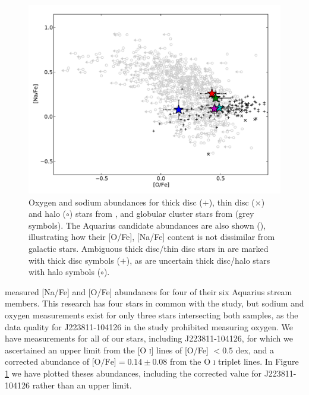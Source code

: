 \documentclass{emulateapj}
\begin{document}
\begin{figure}[t!]
	\includegraphics[width=\textwidth]{./figures/aquarius-o-na-halo.pdf}
	\caption{Oxygen and sodium abundances for thick disc ($+$), thin disc ($\times$) and halo ($\circ$) stars from \citet{reddy;et-al_2005}, and globular cluster stars from \citet{carretta;et-al_2009} (grey symbols). The Aquarius candidate abundances are also shown (\textbullet), illustrating how their [O/Fe], [Na/Fe] content is not dissimilar from galactic stars. Ambiguous thick disc/thin disc stars in \citet{reddy;et-al_2005} are marked with thick disc symbols ($+$), as are uncertain thick disc/halo stars with halo symbols ($\circ$).}
	\label{fig:o-na}
\end{figure}

\citet{wylie-de-boer;et-al_2012} measured [Na/Fe] and [O/Fe] abundances for four of their six Aquarius stream members. This research has four stars in common with the \citet{wylie-de-boer;et-al_2012} study, but sodium and oxygen measurements exist for only three stars intersecting both samples, as the data quality for J223811-104126 in the \citet{wylie-de-boer;et-al_2012} study prohibited measuring oxygen. We have measurements for all of our stars, including J223811-104126, for which we ascertained an upper limit from the [O \textsc{i}] lines of [O/Fe] $< 0.5$ dex, and a corrected abundance of $\mbox{[O/Fe]} = 0.14 \pm 0.08$ from the O \textsc{i} triplet lines. In Figure \ref{fig:o-na} we have plotted theses abundances, including the corrected value for J223811-104126 rather than an upper limit.


\end{document}
